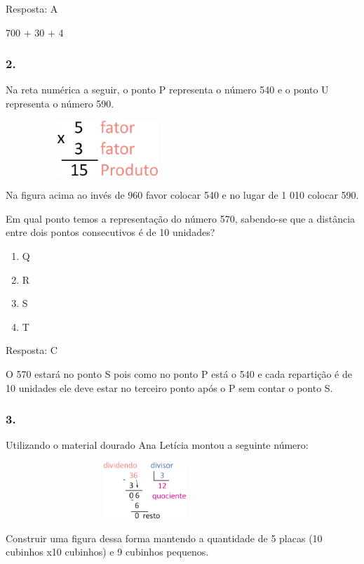 Resposta: A

700 + 30 + 4

\subsubsection{2.}\label{section-14}

Na reta numérica a seguir, o ponto P representa o número 540 e o ponto U
representa o número 590.

\includegraphics[width=3.03205in,height=0.81228in]{media/image12.png}

Na figura acima ao invés de 960 favor colocar 540 e no lugar de 1 010
colocar 590.

Em qual ponto temos a representação do número 570, sabendo-se que a
distância entre dois pontos consecutivos é de 10 unidades?

\begin{enumerate}
\def\labelenumi{\alph{enumi})}
\item
  Q
\item
  R
\item
  S
\item
  T
\end{enumerate}

Resposta: C

O 570 estará no ponto S pois como no ponto P está o 540 e cada
repartição é de 10 unidades ele deve estar no terceiro ponto após o P
sem contar o ponto S.

\subsubsection{3.}\label{section-15}

Utilizando o material dourado Ana Letícia montou a seguinte número:

\includegraphics[width=4.13369in,height=0.83341in]{media/image13.png}

Construir uma figura dessa forma mantendo a quantidade de 5 placas (10
cubinhos x10 cubinhos) e 9 cubinhos pequenos.

